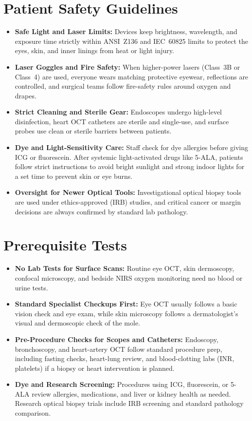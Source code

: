 \section{Patient Safety Guidelines}
\begin{itemize}
  \item \textbf{Safe Light and Laser Limits:} Devices keep brightness, wavelength, and exposure time strictly within ANSI~Z136 and IEC~60825 limits to protect the eyes, skin, and inner linings from heat or light injury.
  \item \textbf{Laser Goggles and Fire Safety:} When higher-power lasers (Class~3B or Class~4) are used, everyone wears matching protective eyewear, reflections are controlled, and surgical teams follow fire-safety rules around oxygen and drapes.
  \item \textbf{Strict Cleaning and Sterile Gear:} Endoscopes undergo high-level disinfection, heart OCT catheters are sterile and single-use, and surface probes use clean or sterile barriers between patients.
  \item \textbf{Dye and Light-Sensitivity Care:} Staff check for dye allergies before giving ICG or fluorescein. After systemic light-activated drugs like 5-ALA, patients follow strict instructions to avoid bright sunlight and strong indoor lights for a set time to prevent skin or eye burns.
  \item \textbf{Oversight for Newer Optical Tools:} Investigational optical biopsy tools are used under ethics-approved (IRB) studies, and critical cancer or margin decisions are always confirmed by standard lab pathology.
\end{itemize}

\section{Prerequisite Tests}
\begin{itemize}
  \item \textbf{No Lab Tests for Surface Scans:} Routine eye OCT, skin dermoscopy, confocal microscopy, and bedside NIRS oxygen monitoring need no blood or urine tests.
  \item \textbf{Standard Specialist Checkups First:} Eye OCT usually follows a basic vision check and eye exam, while skin microscopy follows a dermatologist's visual and dermoscopic check of the mole.
  \item \textbf{Pre-Procedure Checks for Scopes and Catheters:} Endoscopy, bronchoscopy, and heart-artery OCT follow standard procedure prep, including fasting checks, heart-lung review, and blood-clotting labs (INR, platelets) if a biopsy or heart intervention is planned.
  \item \textbf{Dye and Research Screening:} Procedures using ICG, fluorescein, or 5-ALA review allergies, medications, and liver or kidney health as needed. Research optical biopsy trials include IRB screening and standard pathology comparison.
\end{itemize}

